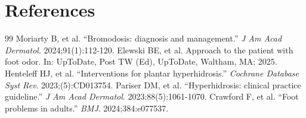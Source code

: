 \section*{References}
\begin{thebibliography}{99}
 Moriarty B, et al. ``Bromodosis: diagnosis and management.'' \emph{J Am Acad Dermatol}. 2024;91(1):112-120.
 Elewski BE, et al. Approach to the patient with foot odor. In: UpToDate, Post TW (Ed), UpToDate, Waltham, MA; 2025.
 Henteleff HJ, et al. ``Interventions for plantar hyperhidrosis.'' \emph{Cochrane Database Syst Rev}. 2023;(5):CD013754.
 Pariser DM, et al. ``Hyperhidrosis: clinical practice guideline.'' \emph{J Am Acad Dermatol}. 2023;88(5):1061-1070.
 Crawford F, et al. ``Foot problems in adults.'' \emph{BMJ}. 2024;384:e077537.
\end{thebibliography}
